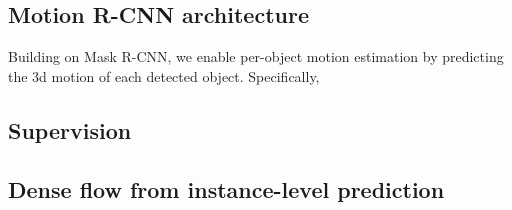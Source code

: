 
\subsection{Motion R-CNN architecture}

Building on Mask R-CNN, we enable per-object motion estimation by predicting the 3d motion of each detected object.
Specifically, 

\subsection{Supervision}
\subsection{Dense flow from instance-level prediction}
